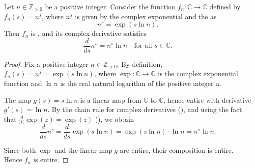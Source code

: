 \begin{proposition} \label{proposition:complex_derivative_of_n_to_the_s_for_fixed_positive_integer_n}
    Let $n \in \mathbb{Z}_{>0}$ be a positive integer. Consider the function $f_n : \mathbb{C} \to \mathbb{C}$ defined by $f_n(s) = n^s$, where $n^s$ is given by the complex exponential and the  as
    $$n^s = \exp(s \ln n).$$
    Then $f_n$ is , and its complex derivative satisfies
    $$\frac{d}{ds} n^s = n^s \ln n \quad \text{for all } s \in \mathbb{C}.$$
\end{proposition}
\begin{proof}
    Fix a positive integer $n \in \mathbb{Z}_{>0}$. By definition, $f_n(s) = n^s = \exp(s \ln n)$, where $\exp : \mathbb{C} \to \mathbb{C}$ is the complex exponential function and $\ln n$ is the real natural logarithm of the positive integer $n$.

    The map $g(s) = s \ln n$ is a linear map from $\mathbb{C}$ to $\mathbb{C}$, hence entire with derivative $g'(s) = \ln n$. By the chain rule for complex derivatives (), and using the fact that $\frac{d}{dz}\exp(z) = \exp(z)$ (), we obtain
    $$\frac{d}{ds} n^s = \frac{d}{ds} \exp(s \ln n) = \exp(s \ln n) \cdot \ln n = n^s \ln n.$$

    Since both $\exp$ and the linear map $g$ are entire, their composition is entire. Hence $f_n$ is entire.
\end{proof}